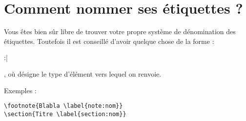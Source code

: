 \section{Comment nommer ses étiquettes ?}

Vous êtes bien sûr libre de trouver votre propre système de dénomination des étiquettes. Toutefois il est conseillé d'avoir quelque chose de la forme : \begin{english}:|\end{english}, où  désigne le type d'élément vers lequel on renvoie.

Exemples :
\begin{english}
\begin{verbatim}
\footnote{Blabla \label{note:nom}}
\section{Titre \label{section:nom}}
\end{verbatim}
\end{english}



